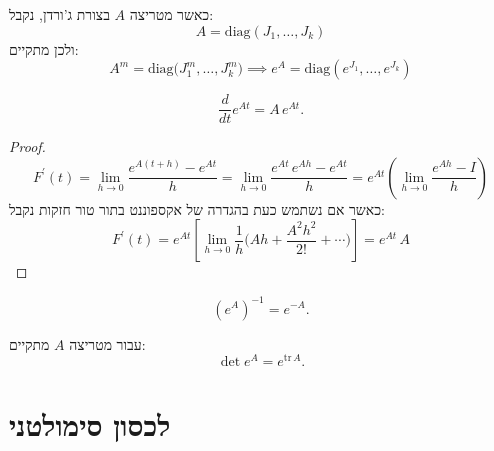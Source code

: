 \documentclass{tstextbook}
\begin{document}
\begin{proposition}
כאשר מטריצה \(A\) בצורת ג'ורדן, נקבל:
$$A=\mathrm{diag}(J_{1},\ldots,J_{k})$$
ולכן מתקיים:
$$A^{m}=\mathrm{diag}\bigl(J_{1}^{m},\ldots,J_{k}^{m}\bigr)\implies e^{A}=\mathrm{diag}(e^{J_{1}},\ldots,e^{J_{k}})$$

\end{proposition}
\begin{proposition}
$${\frac{d}{d t}}e^{A t}=A\,e^{A t}.$$

\end{proposition}
\begin{proof}
$$F^{\prime}(t)=\operatorname*{lim}_{h\to0}{\frac{e^{A(t+h)}-e^{A t}}{h}}=\operatorname*{lim}_{h\to0}{\frac{e^{A t}\,e^{A h}-e^{A t}}{h}}=e^{A t}\left(\operatorname*{lim}_{h\to0}{\frac{e^{A h}-I}{h}}\right)$$
כאשר אם נשתמש כעת בהגדרה של אקספוננט בתור טור חזקות נקבל:
$$F^{\prime}(t)=e^{A t}\left[\operatorname*{lim}_{h\to0}{\frac{1}{h}}\Big(A h+{\frac{A^{2}h^{2}}{2!}}+\cdots\Big)\right]=e^{A t}\,A$$

\end{proof}
\begin{proposition}
$$\left(e^{A}\right)^{-1}=e^{-A}.$$

\end{proposition}
\begin{proposition}
עבור מטריצה \(A\) מתקיים:
$$\operatorname*{det}e^{A}=e^{\mathrm{tr}\,A}.$$

\end{proposition}
\section{לכסון סימולטני}
\end{document}
